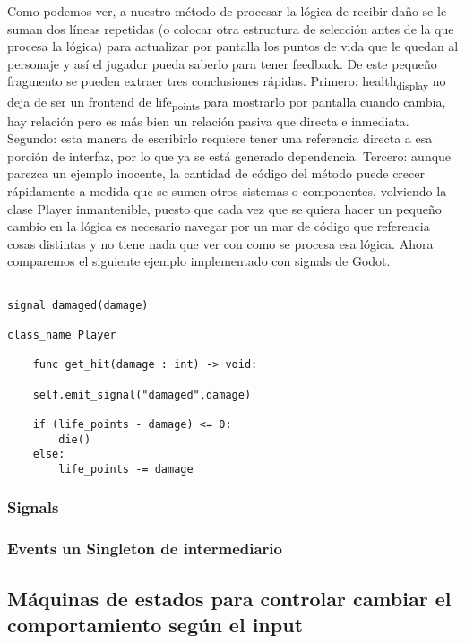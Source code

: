\documentclass[11pt]{article}
\begin{document}
Como podemos ver, a nuestro método de procesar la lógica de recibir daño se le suman dos líneas repetidas (o colocar otra estructura de selección antes de la que procesa la lógica) para actualizar por pantalla los puntos de vida que le quedan al personaje y así el jugador pueda saberlo para tener feedback. De este pequeño fragmento se pueden extraer tres conclusiones rápidas. Primero: health\textsubscript{display} no deja de ser un frontend de life\textsubscript{points} para mostrarlo por pantalla cuando cambia, hay relación pero es más bien un relación pasiva que directa e inmediata. Segundo: esta manera de escribirlo requiere tener una referencia directa a esa porción de interfaz, por lo que ya se está generado dependencia. Tercero: aunque parezca un ejemplo inocente, la cantidad de código del método puede crecer rápidamente a medida que se sumen otros sistemas o componentes, volviendo la clase Player inmantenible, puesto que cada vez que se quiera hacer un pequeño cambio en la lógica es necesario navegar por un mar de código que referencia cosas distintas y no tiene nada que ver con como se procesa esa lógica. Ahora comparemos el siguiente ejemplo implementado con signals de Godot.



\begin{verbatim}

signal damaged(damage)

class_name Player

    func get_hit(damage : int) -> void:

	self.emit_signal("damaged",damage)

	if (life_points - damage) <= 0:
	    die()
	else:
	    life_points -= damage
\end{verbatim}





\subsubsection{Signals}
\label{sec:orga061517}
\subsubsection{Events un Singleton de intermediario}
\label{sec:org58368dd}

\subsection{Máquinas de estados para controlar cambiar el comportamiento según el input}
\label{sec:orgf5a7409}
\end{document}
